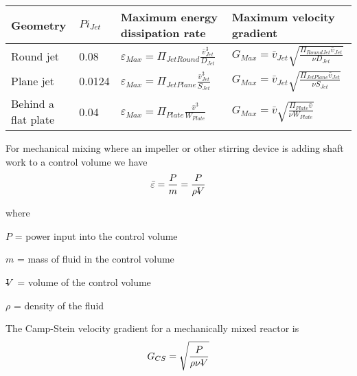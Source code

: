 \documentclass[letterpaper,10pt,english]{sphinxmanual}
\begin{document}
\begin{savenotes}\sphinxattablestart
\raggedright
{}
\label{\detokenize{Rapid_Mix/RM_Intro:id9}}\label{\detokenize{Rapid_Mix/RM_Intro:table-edr-g-equations}}
\sphinxaftercaption
\begin{tabulary}{\linewidth}[t]{|T|T|T|T|}
\hline
\sphinxstyletheadfamily 
Geometry
&
\(Pi_{Jet}\)
&\sphinxstyletheadfamily 
Maximum energy dissipation rate
&\sphinxstyletheadfamily 
Maximum velocity gradient
\\
\hline
Round jet
&
0.08
&
\(\varepsilon_{Max} = \Pi_{JetRound}\frac{   \bar v_{Jet} ^3}{D_{Jet}}\)
&
\(G_{Max} = \bar v_{Jet} \sqrt{\frac{\Pi_{RoundJet} \bar v_{Jet} }{\nu D_{Jet}}}\)
\\
\hline
Plane jet
&
0.0124
&
\(\varepsilon_{Max} = \Pi_{JetPlane} \frac{  \bar v_{Jet} ^3}{S_{Jet}}\)
&
\(G_{Max} = \bar v_{Jet}\sqrt{\frac{\Pi_{JetPlane} \bar v_{Jet}}{\nu S_{Jet}}}\)
\\
\hline
Behind a flat plate
&
0.04
&
\(\varepsilon _{Max} = \Pi_{Plate}\frac{\bar v^3}{W_{Plate}}\)
&
\(G_{Max} = \bar v\sqrt{\frac{\Pi_{Plate} \bar v}{\nu W_{Plate}}}\)
\\
\hline
\end{tabulary}
\par
\sphinxattableend\end{savenotes}

For mechanical mixing where an impeller or other stirring device is adding shaft work to a control volume we have
\begin{equation}\label{equation:Rapid_Mix/RM_Intro:Rapid_Mix/RM_Intro:3}
\begin{split}\bar\varepsilon = \frac{P}{m} = \frac{P}{\rho \rlap{-}V}\end{split}
\end{equation}
\begin{DUlineblock}{0em}
\item[] where
\item[] \(P\) = power input into the control volume
\item[] \(m\) = mass of fluid in the control volume
\item[] \(\rlap{-}V\) = volume of the control volume
\item[] \(\rho\) = density of the fluid
\end{DUlineblock}

The Camp-Stein velocity gradient for a mechanically mixed reactor is
\begin{equation}\label{equation:Rapid_Mix/RM_Intro:Rapid_Mix/RM_Intro:4}
\begin{split}G_{CS} = \sqrt{\frac{P}{\rho \nu \rlap{-}V}}\end{split}
\end{equation}
\end{document}
